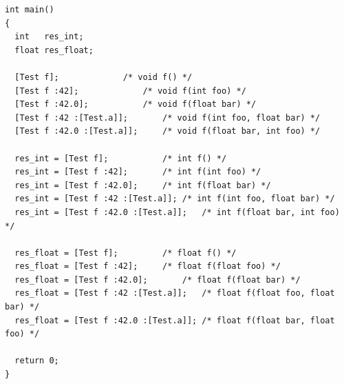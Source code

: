 \documentclass[12pt,a4paper]{article}
\begin{document}
\begin{NoHyper}
\begin{lstlisting}[title={testInference.kc}]
int	main()
{
  int	res_int;
  float	res_float;

  [Test f];				/* void f() */
  [Test f :42];				/* void f(int foo) */
  [Test f :42.0];			/* void f(float bar) */
  [Test f :42 :[Test.a]];		/* void f(int foo, float bar) */
  [Test f :42.0 :[Test.a]];		/* void f(float bar, int foo) */

  res_int = [Test f];			/* int f() */
  res_int = [Test f :42];		/* int f(int foo) */
  res_int = [Test f :42.0];		/* int f(float bar) */
  res_int = [Test f :42 :[Test.a]];	/* int f(int foo, float bar) */
  res_int = [Test f :42.0 :[Test.a]];	/* int f(float bar, int foo) */

  res_float = [Test f];			/* float f() */
  res_float = [Test f :42];		/* float f(float foo) */
  res_float = [Test f :42.0];		/* float f(float bar) */
  res_float = [Test f :42 :[Test.a]];	/* float f(float foo, float bar) */
  res_float = [Test f :42.0 :[Test.a]];	/* float f(float bar, float foo) */

  return 0;
}
\end{lstlisting}
\end{NoHyper}
\end{document}
